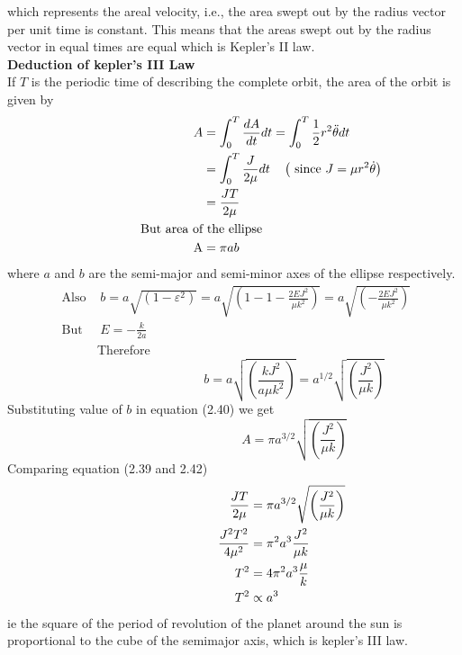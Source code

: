   which represents the areal velocity, i.e., the area swept out by the radius vector per unit time is constant. This means that the areas swept out by the radius vector in equal times are equal which is Kepler's II law.\\
  \textbf{Deduction of kepler's III Law}\\
If $T$ is the periodic time of describing the complete orbit, the area of the orbit is given by\\
\begin{align}
\hspace{3cm}A &=\int_{0}^{T} \frac{d A}{d t} d t=\int_{0}^{T} \frac{1}{2} r^{2} \ddot{\theta} d t \notag \\
&=\int_{0}^{T} \frac{J}{2 \mu} d t \quad\left(\text { since } J=\mu r^{2} \dot{\theta}\right) \notag \\
&=\frac{J T}{2 \mu}\\
\text{But area of}&\text{ the ellipse }\notag\\
\mathrm{A}&=\pi a b
\end{align}
where $a$ and $b$ are the semi-major and semi-minor axes of the ellipse respectively.
$$
\begin{array}{ll}
\text { Also } & b=a \sqrt{\left(1-\varepsilon^{2}\right)}=a \sqrt{\left(1-1-\frac{2 E J^{2}}{\mu k^{2}}\right)}=a \sqrt{\left(-\frac{2 E J^{2}}{\mu k^{2}}\right)} \\
\text { But } & E=-\frac{k}{2 a}
\end{array}
$$
$\hspace{3cm}$Therefore
\begin{equation}
\hspace{4cm}b=a \sqrt{\left(\frac{k J^{2}}{a \mu k^{2}}\right)}=a^{1 / 2} \sqrt{\left(\frac{J^{2}}{\mu k}\right)}
\end{equation}
Substituting value of $b$ in equation (2.40) we get
\begin{equation}
\hspace{4cm}A=\pi a^{3 / 2} \sqrt{\left(\frac{J^{2}}{\mu k}\right)}
\end{equation}
Comparing equation (2.39 and 2.42)
\begin{align}
	\hspace{3cm}\frac{J T}{2 \mu}&=\pi a^{3 / 2} \sqrt{\left(\frac{J^{2}}{\mu k}\right)} \notag \\
	\frac{J^{2} T^{2}}{4 \mu^{2}}&=\pi^{2} a^{3} \frac{J^{2}}{\mu k} \notag \\
	T^{2}&=4 \pi^{2} a^{3} \frac{\mu}{k} \notag \\
	T^{2} &\propto a^{3}
\end{align}
ie the square of the period of revolution of the planet around the sun is proportional to the cube of the semimajor axis, which is kepler's III law.
